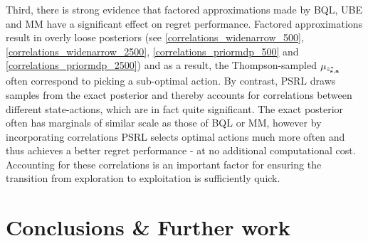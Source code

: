 \documentclass{article}
\begin{document}
Third, there is strong evidence that factored approximations made by BQL, UBE and MM have a significant effect on regret performance. Factored approximations result in overly loose posteriors (see \cref{correlations_widenarrow_500}, \cref{correlations_widenarrow_2500}, \cref{correlations_priormdp_500} and \cref{correlations_priormdp_2500}) and as a result, the Thompson-sampled $\mu_{z^*_{\mathbf{s}, \mathbf{a}}}$ often correspond to picking a sub-optimal action. By contrast, PSRL draws samples from the exact posterior and thereby accounts for correlations between different state-actions, which are in fact quite significant. The exact posterior often has marginals of similar scale as those of BQL or MM, however by incorporating correlations PSRL selects optimal actions much more often and thus achieves a better regret performance - at no additional computational cost. Accounting for these correlations is an important factor for ensuring the transition from exploration to exploitation is sufficiently quick.

\section{Conclusions \& Further work}
\end{document}
